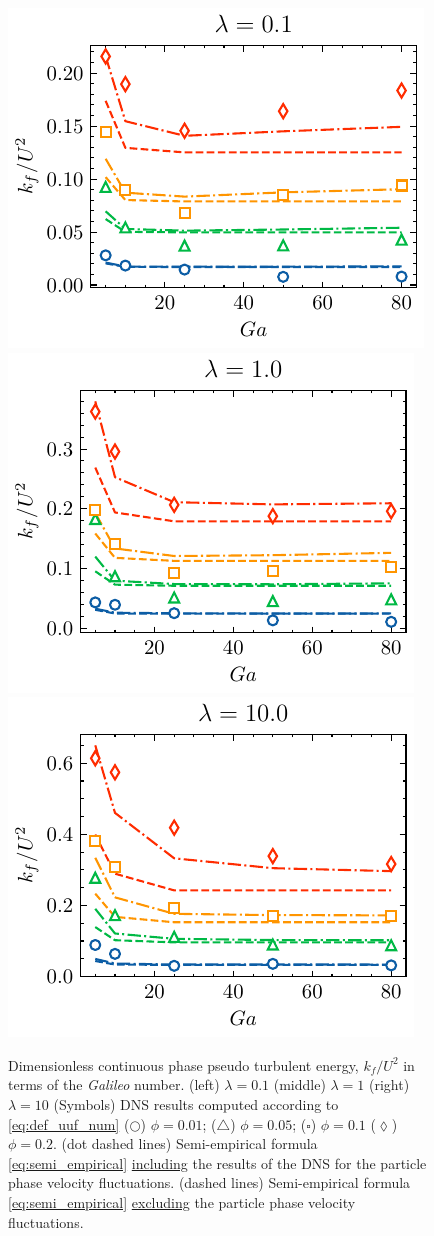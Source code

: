 \begin{figure}
    \centering
    \includegraphics[height = 0.25\textwidth]{image/HOMOGENEOUS_final/CA/KF2_l_0.pdf}
    \includegraphics[height = 0.25\textwidth]{image/HOMOGENEOUS_final/CA/KF2_l_1.pdf}
    \includegraphics[height = 0.25\textwidth]{image/HOMOGENEOUS_final/CA/KF2_l_10.pdf}
    \caption{Dimensionless continuous phase pseudo turbulent energy, $k_f/U^2$ in terms of the \textit{Galileo} number.
    (left) $\lambda = 0.1$
    (middle) $\lambda = 1$
    (right) $\lambda = 10$
    (Symbols) DNS results computed according to \ref{eq:def_uuf_num}
    ($\pmb\bigcirc$) $\phi = 0.01$; ($\pmb\triangle$) $ \phi = 0.05$; ($\pmb\square$) $\phi = 0.1$ ($\pmb\lozenge$) $\phi = 0.2$.
    (dot dashed lines) Semi-empirical formula \ref{eq:semi_empirical} \underline{including} the results of the DNS for the particle phase velocity fluctuations. 
    (dashed lines) Semi-empirical formula \ref{eq:semi_empirical} \underline{excluding} the particle phase velocity fluctuations. 
    }
    \label{fig:kf}
\end{figure}




